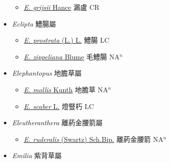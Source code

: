 \begin{itemize}
  \begin{itemize}
        \item[] \href{http://www.theplantlist.org/tpl1.1/search?q=Echinops+grijsii}{\textit{E. grijsii} Hance}   漏盧 CR
  \end{itemize}
 \item[] \textit{Eclipta} 鱧腸屬
                    
  \begin{itemize}
        \item[] \href{http://www.theplantlist.org/tpl1.1/search?q=Eclipta+prostrata}{\textit{E. prostrata} (L.) L.}   鱧腸 LC
        \item[] \href{http://www.theplantlist.org/tpl1.1/search?q=Eclipta+zippeliana}{\textit{E. zippeliana} Blume}   毛鱧腸 NA$^n$
  \end{itemize}
 \item[] \textit{Elephantopus} 地膽草屬
                    
  \begin{itemize}
        \item[] \href{http://www.theplantlist.org/tpl1.1/search?q=Elephantopus+mollis}{\textit{E. mollis} Kunth}   地膽草 NA$^n$
        \item[] \href{http://www.theplantlist.org/tpl1.1/search?q=Elephantopus+scaber}{\textit{E. scaber} L.}   燈豎朽 LC
  \end{itemize}
 \item[] \textit{Eleutheranthera} 離葯金腰箭屬
                    
  \begin{itemize}
        \item[] \href{http://www.theplantlist.org/tpl1.1/search?q=Eleutheranthera+ruderalis}{\textit{E. ruderalis} (Swartz) Sch.Bip.}   離葯金腰箭 NA$^n$
  \end{itemize}
 \item[] \textit{Emilia} 紫背草屬
                    

\end{itemize}
